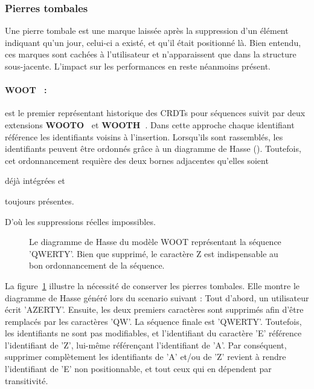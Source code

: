 \subsubsection{Pierres tombales}
\label{repl:subsubsec:tombstone}

Une pierre tombale est une marque laissée après la suppression d'un élément
indiquant qu'un jour, celui-ci a existé, et qu'il était positionné là. Bien
entendu, ces marques sont cachées à l'utilisateur et n'apparaissent que dans la
structure sous-jacente. L'impact sur les performances en reste néanmoins
présent.


\paragraph{WOOT~\cite{oster2006data} :} est le premier représentant historique
des CRDTs pour séquences suivit par deux extensions
\textbf{WOOTO~\cite{weiss2007wooki}} et
\textbf{WOOTH~\cite{ahmed2011evaluating}}. Dans cette approche chaque
identifiant référence les identifiants voisins à l'insertion.  Lorsqu'ils sont
rassemblés, les identifiants peuvent être ordonnés grâce à un diagramme de Hasse
(\REF). Toutefois, cet ordonnancement requière des deux bornes adjacentes
qu'elles soient
\begin{inparaenum}[(i)]
\item déjà intégrées et
\item toujours présentes.
\end{inparaenum}
D'où les suppressions réelles impossibles.

\begin{figure}
  \centering
  
  \caption{\label{repl:fig:wootexample}Le diagramme de Hasse du modèle WOOT
    représentant la séquence 'QWERTY'. Bien que supprimé, le caractère Z est
    indispensable au bon ordonnancement de la séquence.}
\end{figure}

\noindent La figure~\ref{repl:fig:wootexample} illustre la nécessité de
conserver les pierres tombales. Elle montre le diagramme de Hasse généré lors du
scenario suivant : Tout d'abord, un utilisateur écrit 'AZERTY'. Ensuite, les
deux premiers caractères sont supprimés afin d'être remplacés par les caractères
'QW'. La séquence finale est 'QWERTY'. Toutefois, les identifiants ne sont pas
modifiables, et l'identifiant du caractère 'E' référence l'identifiant de 'Z',
lui-même référençant l'identifiant de 'A'. Par conséquent, supprimer
complètement les identifiants de 'A' et/ou de 'Z' revient à rendre l'identifiant
de 'E' non positionnable, et tout ceux qui en dépendent par transitivité.

